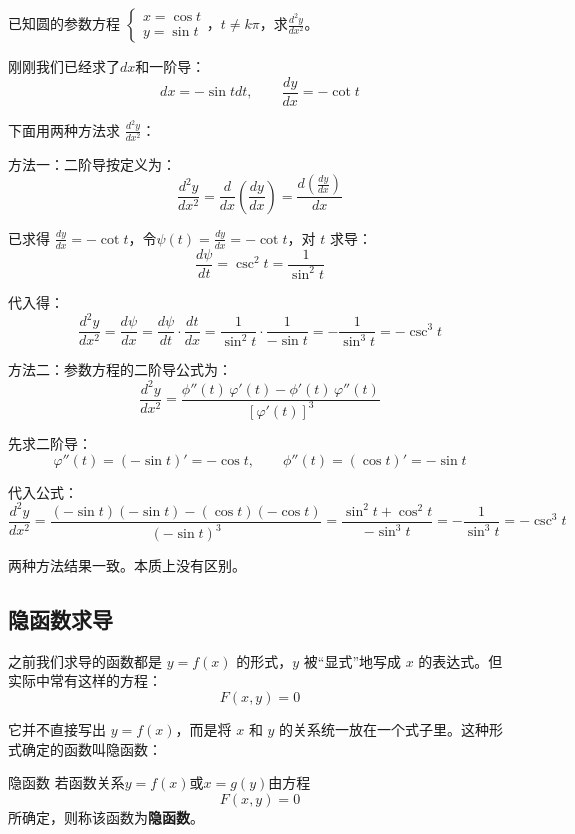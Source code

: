 \begin{myexample}
  已知圆的参数方程 \(\begin{cases}
x = \cos t \\
y = \sin t
\end{cases}\)，$t \neq k\pi$，求$\frac{d^2 y}{dx^2}$。

刚刚我们已经求了$dx$和一阶导：
  \[
  dx = -\sin t dt, \qquad \frac{dy}{dx} = -\cot t
  \]

  下面用两种方法求 $\frac{d^2y}{dx^2}$：

  方法一：二阶导按定义为：
  \[
\frac{d^2y}{dx^2} = \frac{d}{dx} (\frac{dy}{dx}) = \frac{d(\frac{dy}{dx})}{dx}
  \]
  
  已求得 $\frac{dy}{dx} = -\cot t$，令$\psi (t)= \frac{dy}{dx} = -\cot t$，对 $t$ 求导：
  \[
  \frac{d\psi }{dt} = \csc^2 t = \frac{1}{\sin^2 t}
  \]

  代入得：
  \[
  \frac{d^2y}{dx^2} = \frac{d\psi }{dx} = \frac{d\psi }{dt} \cdot \frac{dt}{dx} = \frac{1}{\sin^2 t} \cdot \frac{1}{-\sin t} = -\frac{1}{\sin^3 t} = -\csc^3 t
  \]

  方法二：参数方程的二阶导公式为：
\[
\frac{d^2y}{dx^2} = \frac{\phi''(t)\,\varphi'(t) - \phi'(t)\,\varphi''(t)}{[\varphi'(t)]^3}
\]

  先求二阶导：
  \[\varphi ''(t) = (-\sin t)' = -\cos t, \qquad \phi ''(t) = (\cos t)' = -\sin t\]
  
  代入公式：
  \[
  \frac{d^2y}{dx^2}
  = \frac{(-\sin t)(-\sin t) - (\cos t)(-\cos t)}{(-\sin t)^3}
  = \frac{\sin^2 t + \cos^2 t}{-\sin^3 t}
  = -\frac{1}{\sin^3 t}
  = -\csc^3 t
  \]
  
\end{myexample}

两种方法结果一致。本质上没有区别。

\subsection{隐函数求导}

之前我们求导的函数都是 $y = f(x)$ 的形式，$y$ 被“显式”地写成 $x$ 的表达式。但实际中常有这样的方程：
\[
F(x, y) = 0
\]

它并不直接写出 $y = f(x)$，而是将 $x$ 和 $y$ 的关系统一放在一个式子里。这种形式确定的函数叫隐函数：

\begin{definition}{隐函数}{}
  若函数关系$y = f(x)$或$x = g(y)$由方程
  \[
  F(x, y) = 0
  \]
  所确定，则称该函数为\textbf{隐函数}。
\end{definition}

